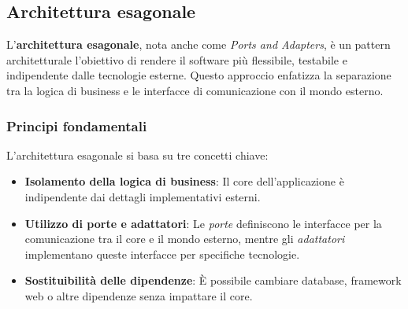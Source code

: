 \subsection{Architettura esagonale}
L’\textbf{architettura esagonale}, nota anche come \textit{Ports and Adapters}, è un pattern architetturale l'obiettivo di rendere il software più flessibile, testabile e indipendente dalle tecnologie esterne. Questo approccio enfatizza la separazione tra la logica di business e le interfacce di comunicazione con il mondo esterno.

\subsubsection{Principi fondamentali}
L'architettura esagonale si basa su tre concetti chiave:
\begin{itemize}
    \item \textbf{Isolamento della logica di business}: Il core dell'applicazione è indipendente dai dettagli implementativi esterni.
    \item \textbf{Utilizzo di porte e adattatori}: Le \textit{porte} definiscono le interfacce per la comunicazione tra il core e il mondo esterno, mentre gli \textit{adattatori} implementano queste interfacce per specifiche tecnologie.
    \item \textbf{Sostituibilità delle dipendenze}: È possibile cambiare database, framework web o altre dipendenze senza impattare il core.
\end{itemize}

